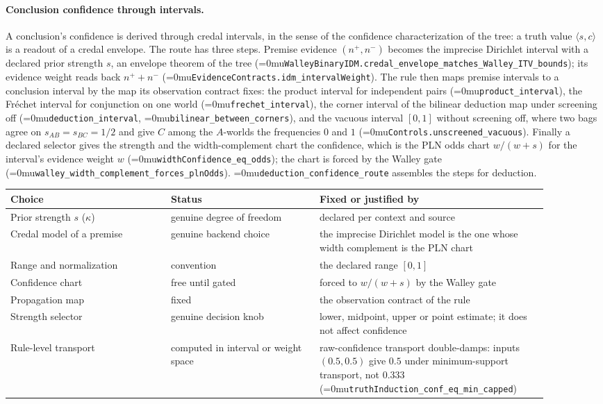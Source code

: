 \documentclass[11pt]{article}
\newcommand{\leanname}[1]{\textup{\Urlmuskip=0mu\relax\nolinkurl{#1}}}
\theoremstyle{definition}
\theoremstyle{remark}
\begin{document}
\paragraph{Conclusion confidence through intervals.}
A conclusion's confidence is derived through credal intervals, in the sense of
the confidence characterization of the tree: a truth value $\langle s,c\rangle$
is a readout of a credal envelope.  The route has three steps.  Premise
evidence $(n^+,n^-)$ becomes the imprecise Dirichlet interval with a declared
prior strength $s$, an envelope theorem of the tree
(\leanname{WalleyBinaryIDM.credal_envelope_matches_Walley_ITV_bounds}); its
evidence weight reads back $n^++n^-$ (\leanname{EvidenceContracts.idm_intervalWeight}).
The rule then maps premise intervals to a conclusion interval by the map its
observation contract fixes: the product interval for independent pairs
(\leanname{product_interval}), the Fréchet interval for conjunction on one world
(\leanname{frechet_interval}), the corner interval of the bilinear deduction map
under screening off (\leanname{deduction_interval},
\leanname{bilinear_between_corners}), and the vacuous interval $[0,1]$ without
screening off, where two bags agree on $s_{AB}=s_{BC}=1/2$ and give $C$ among the
$A$-worlds the frequencies $0$ and $1$ (\leanname{Controls.unscreened_vacuous}).
Finally a declared selector gives the strength and the width-complement chart
the confidence, which is the PLN odds chart $w/(w+s)$ for the interval's
evidence weight $w$ (\leanname{widthConfidence_eq_odds}); the chart is forced by
the Walley gate (\leanname{walley_width_complement_forces_plnOdds}).
\leanname{deduction_confidence_route} assembles the steps for deduction.
\begin{center}
\small
\begin{tabular}{>{\raggedright\arraybackslash}p{0.27\linewidth}%
                >{\raggedright\arraybackslash}p{0.25\linewidth}%
                >{\raggedright\arraybackslash}p{0.38\linewidth}}
\toprule
Choice & Status & Fixed or justified by \\
\midrule
Prior strength $s$ ($\kappa$) & genuine degree of freedom & declared per context
  and source \\
Credal model of a premise & genuine backend choice & the imprecise Dirichlet
  model is the one whose width complement is the PLN chart \\
Range and normalization & convention & the declared range $[0,1]$ \\
Confidence chart & free until gated & forced to $w/(w+s)$ by the Walley gate \\
Propagation map & fixed & the observation contract of the rule \\
Strength selector & genuine decision knob & lower, midpoint, upper or point
  estimate; it does not affect confidence \\
Rule-level transport & computed in interval or weight space & raw-confidence
  transport double-damps: inputs $(0.5,0.5)$ give $0.5$ under minimum-support
  transport, not $0.333$ (\leanname{truthInduction_conf_eq_min_capped}) \\
\bottomrule
\end{tabular}
\end{center}
\end{document}
